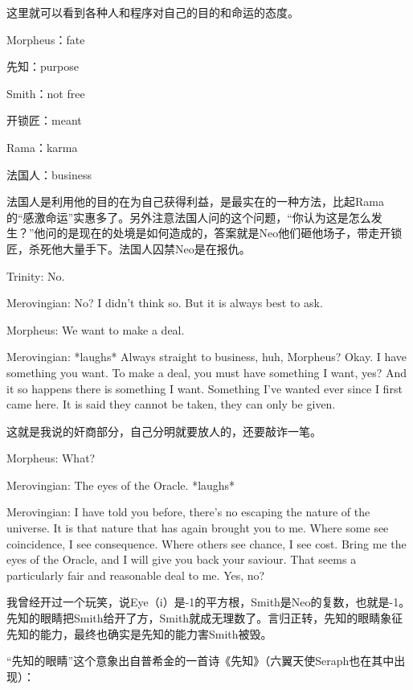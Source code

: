 \documentclass[UTF8]{ctexart}
\newenvironment{myquote}{\color{green} \setlength{\leftskip}{6em} \setlength{\rightskip}{4em} \setlength{\parindent}{-2em}}{\par}
\begin{document}
这里就可以看到各种人和程序对自己的目的和命运的态度。

Morpheus：fate

先知：purpose

Smith：not free

开锁匠：meant

Rama：karma

法国人：business

法国人是利用他的目的在为自己获得利益，是最实在的一种方法，比起Rama的“感激命运”实惠多了。另外注意法国人问的这个问题，“你认为这是怎么发生？”他问的是现在的处境是如何造成的，答案就是Neo他们砸他场子，带走开锁匠，杀死他大量手下。法国人囚禁Neo是在报仇。

\begin{myquote}
Trinity: No.

Merovingian: No? I didn't think so. But it is always best to ask.

Morpheus: We want to make a deal.

Merovingian: *laughs* Always straight to business, huh, Morpheus? Okay. I have something you want. To make a deal, you must have something I want, yes? And it so happens there is something I want. Something I've wanted ever since I first came here. It is said they cannot be taken, they can only be given.
\end{myquote}

这就是我说的奸商部分，自己分明就要放人的，还要敲诈一笔。

\begin{myquote}
Morpheus: What?

Merovingian: The eyes of the Oracle. *laughs*

Merovingian: I have told you before, there's no escaping the nature of the universe. It is that nature that has again brought you to me. Where some see coincidence, I see consequence. Where others see chance, I see cost. Bring me the eyes of the Oracle, and I will give you back your saviour. That seems a particularly fair and reasonable deal to me. Yes, no?
\end{myquote}

我曾经开过一个玩笑，说Eye（i）是-1的平方根，Smith是Neo的复数，也就是-1。先知的眼睛把Smith给开了方，Smith就成无理数了。言归正转，先知的眼睛象征先知的能力，最终也确实是先知的能力害Smith被毁。

“先知的眼睛”这个意象出自普希金的一首诗《先知》（六翼天使Seraph也在其中出现）：
\end{document}
